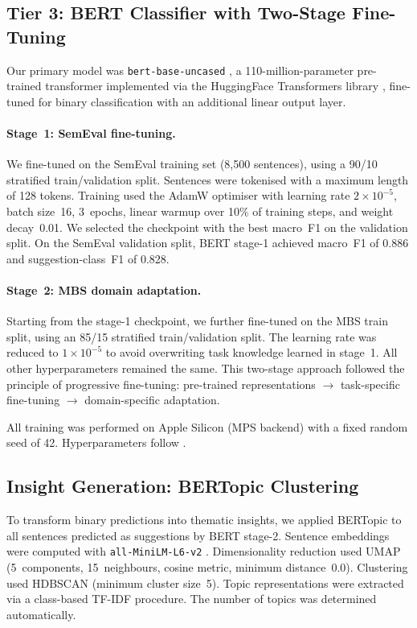 \subsection{Tier 3: BERT Classifier with Two-Stage Fine-Tuning}

Our primary model was \texttt{bert-base-uncased}
\citep{devlin2019bert}, a 110-million-parameter pre-trained
transformer implemented via the HuggingFace Transformers library
\citep{wolf2020transformers}, fine-tuned for binary
classification with an additional linear output layer.

\paragraph{Stage~1: SemEval fine-tuning.} We fine-tuned on the SemEval training
  set (8,500 sentences), using a 90/10 stratified train/validation split.
  Sentences were tokenised with a maximum length of 128 tokens. Training used the
  AdamW optimiser \citep{loshchilov2019adamw} with learning rate
  $2 \times 10^{-5}$, batch size~16,
  3~epochs, linear warmup over 10\% of training steps, and weight decay~0.01. We
  selected the checkpoint with the best macro~F1 on the validation split. On the
  SemEval validation split, BERT stage-1 achieved macro~F1 of 0.886 and
  suggestion-class~F1 of 0.828.

\paragraph{Stage~2: MBS domain adaptation.} Starting from the stage-1
  checkpoint, we further fine-tuned on the MBS train split, using an 85/15
  stratified train/validation split. The learning rate was reduced to $1 \times
  10^{-5}$ to avoid overwriting task knowledge learned in stage~1. All other
  hyperparameters remained the same. This two-stage approach followed the principle
  of progressive fine-tuning: pre-trained representations $\rightarrow$
  task-specific fine-tuning $\rightarrow$ domain-specific adaptation.

All training was performed on Apple Silicon (MPS backend) with a fixed random
seed of 42. Hyperparameters follow \citet{devlin2019bert}.

\subsection{Insight Generation: BERTopic Clustering}

To transform binary predictions into thematic insights, we
applied BERTopic \citep{grootendorst2022bertopic} to all
sentences predicted as suggestions by BERT stage-2. Sentence
embeddings were computed with \texttt{all-MiniLM-L6-v2}
\citep{reimers2019sentence}. Dimensionality reduction used UMAP
\citep{mcinnes2018umap} (5~components, 15~neighbours, cosine
metric, minimum distance~0.0). Clustering used HDBSCAN
\citep{campello2013hdbscan} (minimum cluster size~5). Topic
representations were extracted via a class-based TF-IDF
procedure. The number of topics was determined automatically.

